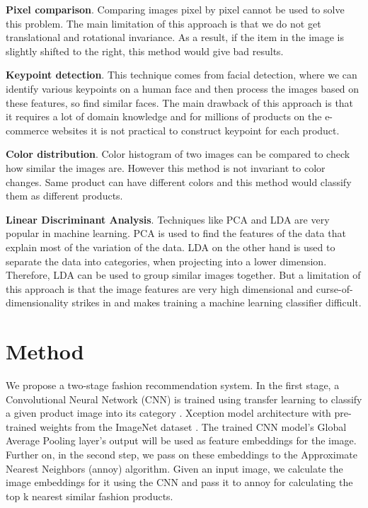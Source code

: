 \documentclass[12pt,twocolumn,letterpaper,Times New Roman]{article}
\begin{document}
\textbf{Pixel comparison}. Comparing images pixel by pixel cannot be used to solve this problem. The main limitation of this approach is that we do not get translational and rotational invariance. As a result, if the item in the image is slightly shifted to the right, this method would give bad results.

\textbf{Keypoint detection}. This technique comes from facial detection, where we can identify various keypoints on a human face and then process the images based on these features, so find similar faces. The main drawback of this approach is that it requires a lot of domain knowledge and for millions of products on the e-commerce websites it is not practical to construct keypoint for each product.

\textbf{Color distribution}. Color histogram of two images can be compared to check how similar the images are. However this method is not invariant to color changes. Same product can have different colors and this method would classify them as different products.

\textbf{Linear Discriminant Analysis}. Techniques like PCA \cite{pca} and LDA \cite{lda} are very popular in machine learning. PCA is used to find the features of the data that explain most of the variation of the data. LDA on the other hand is used to separate the data into categories, when projecting into a lower dimension. Therefore, LDA can be used to group similar images together. But a limitation of this approach is that the image features are very high dimensional and curse-of-dimensionality strikes in and makes training a machine learning classifier difficult.

\section{Method}
We propose a two-stage fashion recommendation system. In the first stage, a Convolutional Neural Network (CNN) is trained using transfer learning to classify a given product image into its category \cite{Tuinhof_2019}. Xception \cite{exception} model architecture with pre-trained weights from the ImageNet dataset \cite{imagenet}. The trained CNN model’s Global Average Pooling layer’s output will be used as feature embeddings for the image. Further on, in the second step, we pass on these embeddings to the Approximate Nearest Neighbors (annoy) algorithm. Given an input image, we calculate the image embeddings for it using the CNN and pass it to annoy for calculating the top k nearest similar fashion products. 
\end{document}

